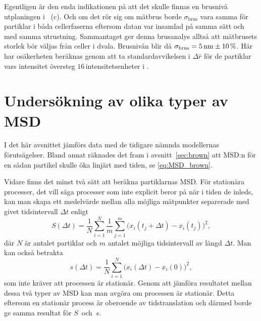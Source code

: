 Egentligen är den enda indikationen på att det skulle finnas en brusnivå utplaningen\footnotemark{} i ~(c). Och om det rör sig om mätbrus borde $\sigma_\text{brus}$ vara samma för partiklar i båda cellerfaserna eftersom datan var insamlad på samma sätt och med samma utrustning. Sammantaget ger denna brusanalys alltså att mätbrusets storlek bör väljas från celler i dvala. Brusnivån blir då $\sigma_\text{brus}=\unit[5]{nm} \pm 10\,\%$. Här har osäkerheten beräknas genom att ta standardavvikelsen i $\Delta\bar{r}$ för de partiklar vars intensitet översteg $16$\,intensitetsenheter i .





\section{Undersökning av olika typer av MSD}

I det här avsnittet jämförs data med de tidigare nämnda modellernas förutsägelser. Bland annat räknades det fram i avsnitt~\ref{sec:brown} att MSD:n för en sådan partikel skulle öka linjärt med tiden, se \eqref{eq:MSD_brown}.

Vidare finns det minst två sätt att beräkna partiklarnas MSD. För stationära processer, det vill säga processer som inte explicit beror på när i tiden de inleds, kan man skapa ett medelvärde mellan alla möjliga mätpunkter separerade med givet tidsintervall $\Delta{t}$ enligt
\begin{equation} \label{eq:MSD_S}
S(\Delta t)= \frac{1}{N}\sum^N_{i=1}\frac{1}{m}\sum^m_{j=1}
\Big( x_i(t_j+\Delta t)-x_i(t_j) \Big)^2,
\end{equation} 
där $N$ är antalet partiklar och $m$ antalet möjliga tidsintervall av längd $\Delta t$. 
Man kan också betrakta
\begin{equation} \label{eq:MSD_s}%
s(\Delta t)= \frac{1}{N}\sum^N_{i=1}
\Big( x_i(\Delta t)-x_i(0)\Big )^2,
\end{equation} 
som inte kräver att processen är stationär.
Genom att jämföra resultatet mellan dessa två typer av MSD kan man avgöra om processen är stationär. Detta eftersom en stationär process är oberoende av tidstranslation och därmed borde ge samma resultat för $S$~och~$s$. 

